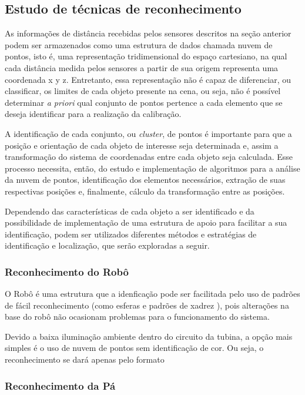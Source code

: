 \subsection{Estudo de técnicas de reconhecimento} 

As informações de distância recebidas pelos sensores descritos na seção
anterior podem ser armazenados como uma estrutura de dados chamada nuvem de
pontos, isto é, uma representação tridimensional do espaço cartesiano, na qual cada distância medida pelos
sensores a partir de sua origem representa uma coordenada x y z.
Entretanto, essa representação não é capaz de diferenciar, ou classificar, os
limites de cada objeto presente na cena, ou seja, não é possível determinar
\textit{a priori} qual conjunto de pontos pertence a cada elemento que se deseja
identificar para a realização da calibração.

A identificação de cada conjunto, ou \textit{cluster}, de pontos é importante
para que a posição e orientação de cada objeto de interesse seja determinada e,
assim a transformação do sistema de coordenadas entre cada objeto seja
calculada. Esse processo necessita, então, do estudo e implementação de
algoritmos para a análise da nuvem de pontos, identificação dos elementos
necessários, extração de suas respectivas posições e, finalmente, cálculo da
transformação entre as posições. 

Dependendo das características de cada objeto a ser identificado e da
possibilidade de implementação de uma estrutura de apoio para facilitar a sua
identificação, podem ser utilizados diferentes métodos e estratégias de
identificação e localização, que serão exploradas a seguir.

\subsubsection{Reconhecimento do Robô}

O Robô é uma estrutura que a idenficação pode ser facilitada pelo uso de
padrões de fácil reconhecimento (como esferas e padrões de xadrez ), pois
alterações na base do robô não ocasionam problemas para o funcionamento do sistema.

Devido a baixa iluminação ambiente dentro do circuito da tubina, a opção
mais simples é o uso de nuvem de pontos sem identificação de cor. Ou seja, o
reconhecimento se dará apenas pelo formato 


\subsubsection{Reconhecimento da Pá} 

